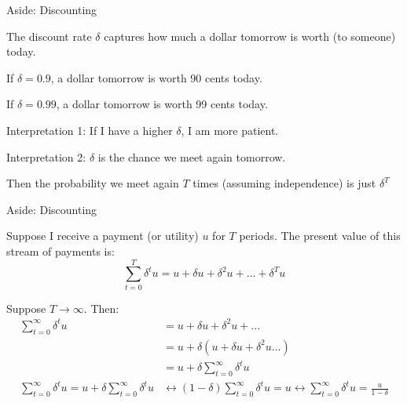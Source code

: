 \documentclass[aspectratio=169,usenames,dvipsnames]{beamer}
\newenvironment{wideitemize}{\itemize\addtolength{\itemsep}{10pt}}{\enditemize}
\begin{document}
\begin{frame}{Aside: Discounting}
\begin{wideitemize}
    \item The discount rate $\delta$ captures how much a dollar tomorrow is worth (to someone) today.
    \item If $\delta=0.9$, a dollar tomorrow is worth 90 cents today.
    \item If $\delta=0.99$, a dollar tomorrow is worth 99 cents today.
    \item Interpretation 1: If I have a higher $\delta$, I am more patient.
    \item Interpretation 2: $\delta$ is the chance we meet again tomorrow.
    \begin{wideitemize}
          \item Then the probability we meet again $T$ times (assuming independence) is just $\delta^T$
    \end{wideitemize}
  
\end{wideitemize}
    
\end{frame}


\begin{frame}{Aside: Discounting}
\begin{wideitemize}
    \item Suppose I receive a payment (or utility) $u$ for $T$ periods. The present value of this stream of payments is:
    \[\sum_{t=0}^T \delta^t u=u+\delta u +\delta^2 u+...+\delta^Tu\]
    \pause
    \item Suppose $T\to \infty$. Then:
    \begin{align*}
        \sum_{t=0}^\infty \delta^t u&=u+\delta u +\delta^2 u+...\\
        &= u + \delta (u + \delta u + \delta^2 u...)\\
        &=  u + \delta  \sum_{t=0}^\infty \delta^t u\\
        \sum_{t=0}^\infty \delta^t u = u + \delta  \sum_{t=0}^\infty \delta^t u &\leftrightarrow (1-\delta)\sum_{t=0}^\infty \delta^t u  = u \leftrightarrow \sum_{t=0}^\infty \delta^t u = \frac{u}{1-\delta}
    \end{align*}
\end{wideitemize}
\end{frame}
\end{document}
